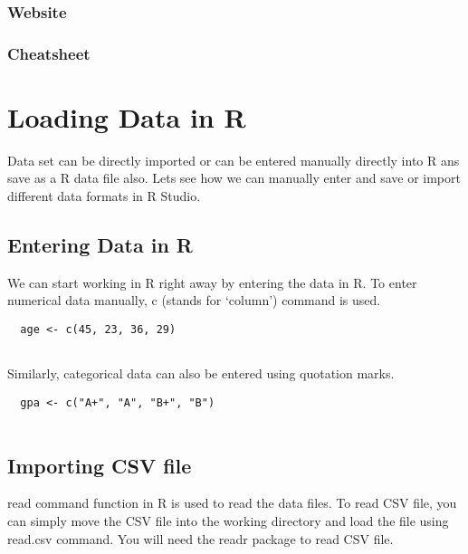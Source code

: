 \documentclass[
]{book}
\begin{document}
\hypertarget{website}{%
\subsection{Website}\label{website}}

\hypertarget{cheatsheet}{%
\subsection{Cheatsheet}\label{cheatsheet}}

\hypertarget{loading-data-in-r}{%
\chapter{Loading Data in R}\label{loading-data-in-r}}

Data set can be directly imported or can be entered manually directly into R ans save as a R data file also. Lets see how we can manually enter and save or import different data formats in R Studio.

\hypertarget{entering-data-in-r}{%
\section{Entering Data in R}\label{entering-data-in-r}}

We can start working in R right away by entering the data in R. To enter numerical data manually, c (stands for `column') command is used.

\begin{verbatim}
  age <- c(45, 23, 36, 29)
  
\end{verbatim}

Similarly, categorical data can also be entered using quotation marks.

\begin{verbatim}
  gpa <- c("A+", "A", "B+", "B")
  
\end{verbatim}

\hypertarget{importing-csv-file}{%
\section{Importing CSV file}\label{importing-csv-file}}

read command function in R is used to read the data files. To read CSV file, you can simply move the CSV file into the working directory and load the file using read.csv command. You will need the readr package to read CSV file.
\end{document}
